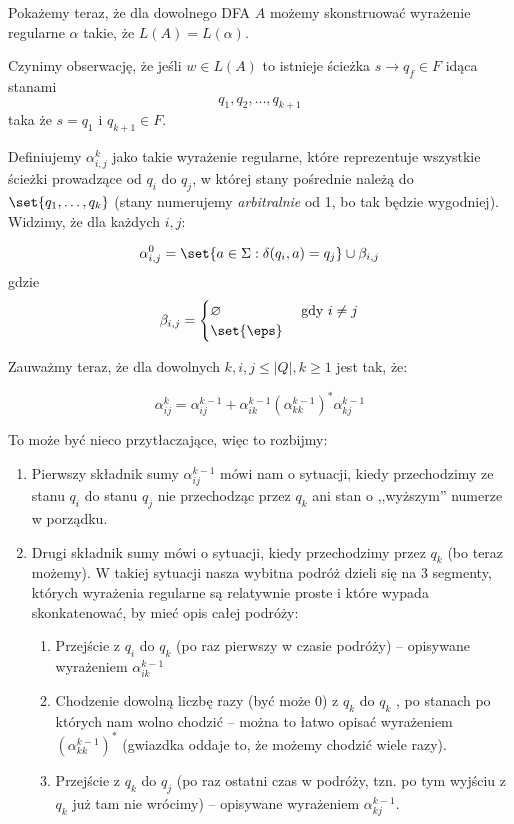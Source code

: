     Pokażemy teraz, że dla dowolnego DFA \(A\) możemy skonstruować wyrażenie regularne \(\alpha\) takie, że \( L(A) = L(\alpha)\). 
    
     Czynimy obserwację, że jeśli \( w \in L(A) \) to istnieje ścieżka \( s \rightarrow q_f \in F \) idąca stanami
    \[
        q_1, q_2, \dots, q_{k+1}
    \]
    taka że \( s = q_1 \) i \( q_{k+1} \in F\).
    
    Definiujemy \( \alpha_{i, j}^k \) jako takie wyrażenie regularne, które reprezentuje wszystkie ścieżki prowadzące od \( q_i \) do \( q_j \), w której stany pośrednie należą do \( \set{q_1, \dots, q_k} \) (stany numerujemy \textit{arbitralnie} od 1, bo tak będzie wygodniej). Widzimy, że dla każdych \(i, j\):
    
    \[
        \alpha_{i, j}^0 = \set{a \in \Sigma : \delta(q_i, a) = q_j } \cup \beta_{i, j}
    \]
    gdzie
    \[
        \beta_{i, j} = \begin{cases}
            \varnothing & \text{ gdy } i \neq j \\
            \set{\eps}
        \end{cases}
    \]
    
    Zauważmy teraz, że dla dowolnych \(k, i, j \leq |Q|, k \geq 1 \) jest tak, że:
    
    \[ 
        \alpha^{k}_{ij} = \alpha^{k-1}_{ij} + \alpha^{k-1}_{ik} (\alpha^{k-1}_{kk})^* \alpha^{k-1}_{kj} 
    \]
    
    To może być nieco przytłaczające, więc to rozbijmy: 
    
    \begin{enumerate}
        \item Pierwszy składnik sumy \( \alpha^{k-1}_{ij} \) mówi nam o sytuacji, kiedy przechodzimy ze stanu \(q_i\) do stanu \(q_j\) nie przechodząc przez \(q_k\)  ani stan o ,,wyższym'' numerze w porządku.
        \item Drugi składnik sumy mówi o sytuacji, kiedy przechodzimy przez \(q_k\) (bo teraz możemy). W takiej sytuacji nasza wybitna podróż dzieli się na 3 segmenty, których wyrażenia regularne są relatywnie proste i które wypada skonkatenować, by mieć opis całej podróży:
        
        \begin{enumerate}
            \item Przejście z \(q_i\) do \(q_k\) (po raz pierwszy w czasie podróży) -- opisywane wyrażeniem \(\alpha^{k-1}_{ik}\)
            \item Chodzenie dowolną liczbę razy (być może 0) z \(q_k\) do \(q_k\) , po stanach po których nam wolno chodzić -- można to łatwo opisać wyrażeniem \( (\alpha^{k-1}_{kk})^* \) (gwiazdka oddaje to, że możemy chodzić wiele razy).
            \item Przejście z \(q_k\) do \(q_j\) (po raz ostatni czas w podróży, tzn. po tym wyjściu z \(q_k\) już tam nie wrócimy) -- opisywane wyrażeniem \( \alpha^{k-1}_{kj}  \). 
        \end{enumerate}
    \end{enumerate}
    
